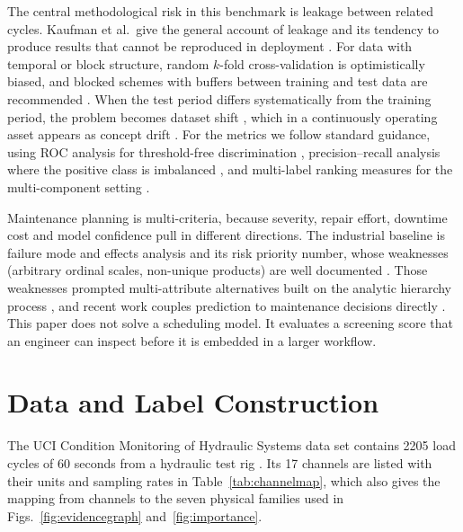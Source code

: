 \documentclass[journal]{IEEEtran}
\begin{document}
The central methodological risk in this benchmark is leakage between related
cycles. Kaufman et al.\ give the general account of leakage and its tendency to
produce results that cannot be reproduced in deployment \cite{Kaufman2012Leakage}.
For data with temporal or block structure, random $k$-fold cross-validation is
optimistically biased, and blocked schemes with buffers between training and test
data are recommended \cite{Roberts2017CVStrategies,Bergmeir2012CVTimeSeries}. When
the test period differs systematically from the training period, the problem
becomes dataset shift
\cite{QuinoneroCandela2009DatasetShift,MorenoTorres2012UnifyingView}, which in a
continuously operating asset appears as concept drift \cite{Gama2014ConceptDrift}.
For the metrics we follow standard guidance, using ROC analysis for threshold-free
discrimination \cite{Fawcett2006ROC}, precision--recall analysis where the positive
class is imbalanced \cite{Davis2006PRvsROC,Saito2015PRPlot}, and multi-label ranking
measures for the multi-component setting
\cite{Tsoumakas2007MultiLabel,Zhang2014MultiLabelReview}.

Maintenance planning is multi-criteria, because severity, repair effort, downtime cost
and model confidence pull in different directions. The industrial baseline is failure
mode and effects analysis and its risk priority number, whose weaknesses
(arbitrary ordinal scales, non-unique products) are well documented
\cite{IEC60812,Liu2013FMEAReview}. Those weaknesses prompted multi-attribute
alternatives built on the analytic hierarchy process
\cite{Saaty1980AHP,Braglia2000MAFMA}, and recent work couples prediction to
maintenance decisions directly
\cite{Achour2024SelectiveMaintenance,CIE2024MultiObjectivePdM,JMSY2024DRLMaintenance}.
This paper does not solve a scheduling model. It evaluates a screening score that an
engineer can inspect before it is embedded in a larger workflow.

\section{Data and Label Construction}
\label{sec:data}

The UCI Condition Monitoring of Hydraulic Systems data set contains 2205 load cycles
of 60 seconds from a hydraulic test rig \cite{Helwig2015Hydraulic}. Its 17 channels
are listed with their units and sampling rates in Table~\ref{tab:channelmap}, which
also gives the mapping from channels to the seven physical families used in
Figs.~\ref{fig:evidencegraph} and~\ref{fig:importance}.
\end{document}
